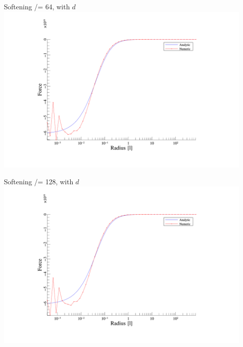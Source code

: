 \begin{frame}{Softening /= 64, with $d$}
	\includegraphics[width=0.95\textwidth]{figures/plots/forces_d_64.png}
\end{frame}

\begin{frame}{Softening /= 128, with $d$}
	\includegraphics[width=0.95\textwidth]{figures/plots/forces_d_128.png}
\end{frame}

